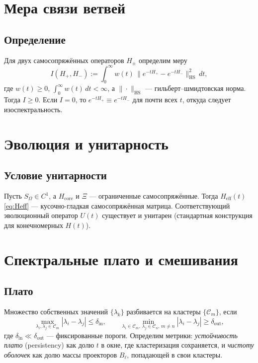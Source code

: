\documentclass[a4paper,12pt]{article}
\begin{document}
\section{Мера связи ветвей}
\subsection*{Определение}
Для двух самосопряжённых операторов $H_\pm$ определим меру
\begin{equation}
I(H_+,H_-):=\int_0^\infty w(t)\,\big\| e^{-tH_+}-e^{-tH_-}\big\|^2_{\mathrm{HS}}\,dt,
\end{equation}
где $w(t)\ge0$, $\int_0^\infty w(t)\,dt<\infty$, а $\|\cdot\|_{\mathrm{HS}}$ --- гильберт--шмидтовская норма.
Тогда $I\ge0$. Если $I=0$, то $e^{-tH_+}\equiv e^{-tH_-}$ для почти всех $t$, откуда следует изоспектральность.

\section{Эволюция и унитарность}
\subsection*{Условие унитарности}
Пусть $S_\Omega\in C^1$, а $H_{\mathrm{core}}$ и $\Xi$ --- ограниченные самосопряжённые.
Тогда $H_{\mathrm{eff}}(t)$ \eqref{eq:Heff} --- кусочно-гладкая самосопряжённая матрица.
Соответствующий эволюционный оператор $U(t)$ существует и унитарен (стандартная конструкция для конечномерных $H(t)$).

\section{Спектральные плато и смешивания}
\subsection*{Плато}
Множество собственных значений $\{\lambda_k\}$ разбивается на кластеры $\{\mathcal{C}_m\}$, если
\begin{equation}
\max_{\lambda_i,\lambda_j\in\mathcal{C}_m} |\lambda_i-\lambda_j| \le \delta_{\mathrm{in}}, \qquad
\min_{\lambda_i\in\mathcal{C}_m,\,\lambda_j\in\mathcal{C}_n,\,m\ne n} |\lambda_i-\lambda_j| \ge \delta_{\mathrm{out}},
\end{equation}
где $\delta_{\mathrm{in}}\ll\delta_{\mathrm{out}}$ --- фиксированные пороги.
Определим метрики: \emph{устойчивость плато} (persistency) как долю $t$ в окне, где кластеризация сохраняется, и \emph{чистоту оболочек} как долю массы проекторов $B_\ell$, попадающей в свои кластеры.
\end{document}

